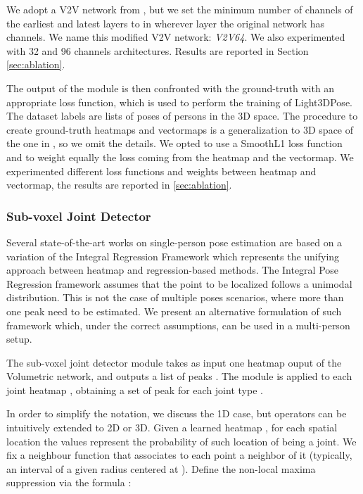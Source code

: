 \documentclass[a4paper,conference]{IEEEtran}
\newcommand{\thename}{Light3DPose}
\begin{document}
We adopt a V2V network from \cite{moon2018v2v}, but we set
the minimum number of channels of the earliest and latest 
layers to  in wherever layer the original network has  channels. 
We name this modified V2V network: \emph{V2V64}. We also
experimented with 32 and 96 channels architectures.
Results are reported in Section \ref{sec:ablation}.

The output  of the module is then confronted with the ground-truth
with an appropriate loss function, which is used to perform the training
of \thename.
The dataset labels are lists of poses of persons in the 3D space. 
The procedure to create ground-truth heatmaps and vectormaps 
is a generalization to 3D space of the one in \cite{cao2017realtime},
so we omit the details.
We opted to use a SmoothL1 loss function and to weight 
equally the loss coming from the heatmap and the vectormap. 
We experimented different loss functions and weights between heatmap
and vectormap, the results are reported in \ref{sec:ablation}.


\subsubsection{Sub-voxel Joint Detector}
Several state-of-the-art works on single-person pose estimation  are based on 
a variation of the Integral Regression Framework 
\cite{sun2018integral, iskakov2019learnable, sun2019deep}
which represents the unifying approach between heatmap 
and regression-based methods.
The Integral Pose Regression framework assumes that 
the point to be localized follows a unimodal distribution.
This is not the case 
of multiple poses scenarios, where more than one peak need 
to be estimated.
We present an alternative formulation of such
framework which, under the correct assumptions, can be used 
in a multi-person setup.

The sub-voxel joint detector module takes as input one
heatmap  ouput of the Volumetric network, and outputs
a list of peaks . The module is applied to
each joint heatmap , obtaining a set of peak
for each joint type .

In order to simplify the notation, we discuss the 1D case, 
but operators can be intuitively extended to 2D or 3D. 
Given a learned heatmap ,
for each spatial location  the values  
represent the probability of such location of being a joint.
We fix a neighbour function 
that associates to each point a neighbor of it
(typically, an interval of a given radius centered at ).
Define the non-local maxima suppression 
 via the formula :
\end{document}

